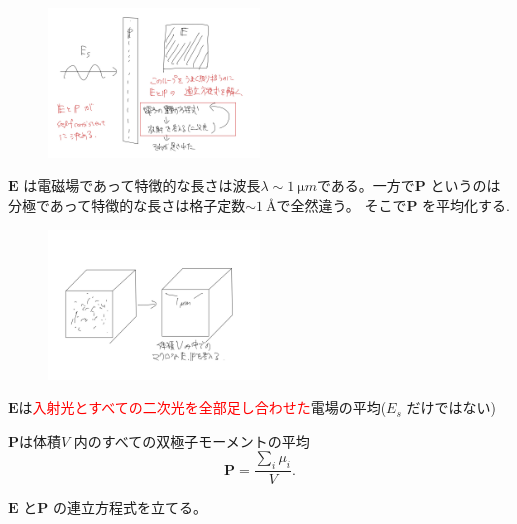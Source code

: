 \documentclass[dvipdfmx,12pt]{jsarticle}
\begin{document}
\begin{figure}[H]
	\centering
	\includegraphics[width=0.5\textwidth]{fig3/Fig-9.jpg}
	\label{fig:fig3-Fig-9-jpg}
\end{figure}
$\bm{E}$ は電磁場であって特徴的な長さは波長$\lambda\sim \SI{1}{\micro m}$である。一方で$\bm{P}$ というのは分極であって特徴的な長さは格子定数$\sim \SI{1}{\angstrom}$で全然違う。
そこで$\bm{P}$ を平均化する.

\begin{figure}[H]
	\centering
	\includegraphics[width=0.5\textwidth]{fig3/Fig-10.jpg}
	\label{fig:fig3-Fig-10-jpg}
\end{figure}
\begin{tcolorbox}[colback=green!10!white]
$\bm{E}$は\textcolor{red}{入射光とすべての二次光を全部足し合わせた}電場の平均($E_s$ だけではない)

$\bm{P}$は体積$V$ 内のすべての双極子モーメントの平均
\begin{equation}
\label{eq:3-2'}
	\bm{P}=\frac{\sum_{i}^{} \mu_i}{V}
.\end{equation}
\end{tcolorbox}
$\bm{E}$ と$\bm{P}$ の連立方程式を立てる。
\end{document}
